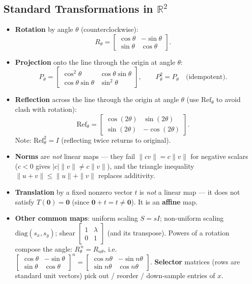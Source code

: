 \documentclass[hidelinks]{article}
\begin{document}
\subsection{Standard Transformations in $\mathbb{R}^2$}
\begin{itemize}
    \item \textbf{Rotation} by angle $\theta$ (counterclockwise):
    \[
        R_\theta = \begin{bmatrix}\cos\theta & -\sin\theta \\ \sin\theta & \cos\theta\end{bmatrix}.
    \]
    \item \textbf{Projection} onto the line through the origin at angle $\theta$:
    \[
        P_\theta = \begin{bmatrix}\cos^2\!\theta & \cos\theta\sin\theta \\ \cos\theta\sin\theta & \sin^2\!\theta\end{bmatrix},\qquad P_\theta^2 = P_\theta \quad\text{(idempotent)}.
    \]
    \item \textbf{Reflection} across the line through the origin at angle $\theta$ (use $\mathrm{Ref}_\theta$ to avoid clash with rotation):
    \[
        \mathrm{Ref}_\theta = \begin{bmatrix}\cos(2\theta) & \sin(2\theta) \\ \sin(2\theta) & -\cos(2\theta)\end{bmatrix}.
    \]
    Note: $\mathrm{Ref}_\theta^2 = I$ (reflecting twice returns to original).
    \item \textbf{Norms} are \emph{not} linear maps — they fail $\|c v\| = c\|v\|$ for negative scalars ($c < 0$ gives $|c|\|v\| \neq c\|v\|$), and the triangle inequality $\|u+v\|\leq\|u\|+\|v\|$ replaces additivity.
    \item \textbf{Translation} by a fixed nonzero vector $t$ is \emph{not} a linear map — it does not satisfy $T(\mathbf{0})=\mathbf{0}$ (since $\mathbf{0}+t = t \neq \mathbf{0}$). It is an \textbf{affine} map.
    \item \textbf{Other common maps}: uniform scaling $S = sI$; non-uniform scaling $\mathrm{diag}(s_x, s_y)$; shear $\begin{bmatrix}1&\lambda\\0&1\end{bmatrix}$ (and its transpose). Powers of a rotation compose the angle: $R_\theta^{\,n} = R_{n\theta}$, i.e. $\begin{bmatrix}\cos\theta & -\sin\theta\\ \sin\theta&\cos\theta\end{bmatrix}^{n} = \begin{bmatrix}\cos n\theta & -\sin n\theta\\ \sin n\theta & \cos n\theta\end{bmatrix}$. \textbf{Selector} matrices (rows are standard unit vectors) pick out / reorder / down-sample entries of $x$.
\end{itemize}
\end{document}
